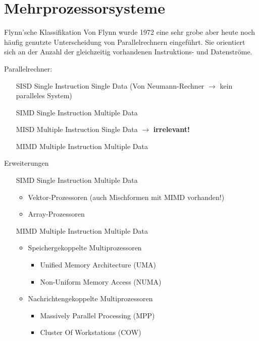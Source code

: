 \section{Mehrprozessorsysteme}

\begin{defi}{Flynn'sche Klassifikation}
    Von Flynn wurde 1972 eine sehr grobe aber heute noch häufig genutzte Unterscheidung von Parallelrechnern eingeführt.
    Sie orientiert sich an der Anzahl der gleichzeitig vorhandenen Instruktions- und Datenströme.
    
    Parallelrechner:
    \begin{itemize}
        \item[SISD] Single Instruction Single Data (Von Neumann-Rechner $\to$ kein paralleles System)
        \item[SIMD] Single Instruction Multiple Data
        \item[MISD] Multiple Instruction Single Data $\to$ \textbf{irrelevant!}
        \item[MIMD] Multiple Instruction Multiple Data
    \end{itemize}
\end{defi}

\begin{bonus}{Erweiterungen}
    \begin{itemize}
        \item[SIMD] Single Instruction Multiple Data
        \begin{itemize}
            \item Vektor-Prozessoren (auch Mischformen mit MIMD vorhanden!)
            \item Array-Prozessoren
        \end{itemize}
        \item[MIMD] Multiple Instruction Multiple Data
        \begin{itemize}
            \item Speichergekoppelte Multiprozessoren
            \begin{itemize}
                \item Unified Memory Architecture (UMA)
                \item Non-Uniform Memory Access (NUMA)
            \end{itemize}
            \item Nachrichtengekoppelte Multiprozessoren
            \begin{itemize}
                \item Massively Parallel Processing (MPP)
                \item Cluster Of Workstations (COW)
            \end{itemize}
        \end{itemize}
    \end{itemize}
\end{bonus}

